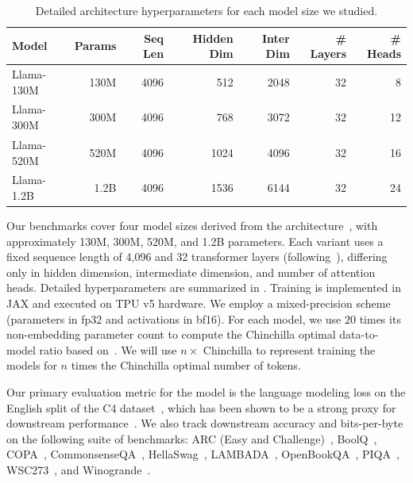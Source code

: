 \begin{table}[t]
  \centering
  \begin{tabular}{lrrrrrr}
    \toprule
    \textbf{Model} & \textbf{Params} & \textbf{Seq Len} & \textbf{Hidden Dim} & \textbf{Inter Dim} & \textbf{\# Layers} & \textbf{\#  Heads} \\
    \midrule
    Llama-130M   & 130M  & 4096 & 512  & 2048  & 32 & 8   \\
    Llama-300M   & 300M  & 4096 & 768  & 3072  & 32 & 12  \\
    Llama-520M   & 520M  & 4096 & 1024 & 4096  & 32 & 16  \\
    Llama-1.2B   & 1.2B  & 4096 & 1536 & 6144  & 32 & 24 \\
    \bottomrule
  \end{tabular}
  \caption{Detailed architecture hyperparameters for each model size we studied.}
  \label{tab:model-configs}
\end{table}

Our benchmarks cover four model sizes derived from the architecture~\cite{touvron2023llamaopenefficientfoundation,touvron2023llama2openfoundation,grattafiori2024llama3herdmodels}, with approximately 130M, 300M, 520M, and 1.2B parameters. Each variant uses a fixed sequence length of 4,096 and 32 transformer layers (following~\cite{liu2024mobilellmoptimizingsubbillionparameter}), differing only in hidden dimension, intermediate dimension, and number of attention heads. Detailed hyperparameters are summarized in . Training is implemented in JAX and executed on TPU v5 hardware. We employ a mixed-precision scheme (parameters in fp32 and activations in bf16). For each model, we use $20$ times its non-embedding parameter count to compute the Chinchilla optimal data-to-model ratio based on~\cite{hoffmann2022trainingcomputeoptimallargelanguage}. We will use \textbf{$n \times$} Chinchilla to represent training the models for $n$ times the Chinchilla optimal number of tokens.

Our primary evaluation metric for the model is the language modeling loss on the English split of the C4 dataset~\cite{raffel2023exploringlimitstransferlearning}, which has been shown to be a strong proxy for downstream performance~\cite{bhagia2024establishingtaskscalinglaws}. We also track downstream accuracy and bits-per-byte on the following suite of benchmarks: ARC (Easy and Challenge)~\cite{Clark2018ARC}, BoolQ~\cite{Clark2019BoolQ}, COPA~\cite{Gordon2012COPA}, CommonsenseQA~\cite{Talmor2018CommonsenseQA}, HellaSwag~\cite{Zellers2019HellaSwag}, LAMBADA~\cite{Paperno2016LAMBADA}, OpenBookQA~\cite{Mihaylov2018OpenBookQA}, PIQA~\cite{Bisk2020PIQA}, WSC273~\cite{levesque2012winograd}, and Winogrande~\cite{Sakaguchi2020WinoGrande}.


